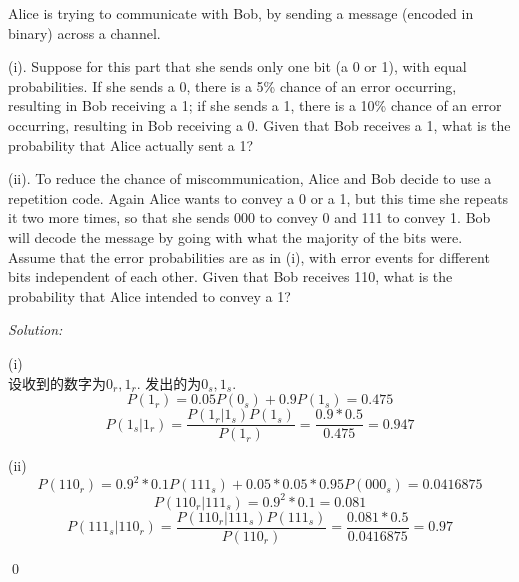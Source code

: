 \documentclass[12pt]{article}
\newenvironment{problem}[2][Problem]{\begin{trivlist}
\item[\hskip \labelsep {\bfseries #1}\hskip \labelsep {\bfseries #2.}]}{\end{trivlist}}
\newenvironment{sol}
    {\emph{Solution:}
    }
    {
    \qed
    }
\newcommand{\f}[2]{\frac{#1}{#2}}                                      %
\begin{document}
\begin{problem}{10}
Alice is trying to communicate with Bob, by sending a message (encoded in binary) across a channel.

(i). Suppose for this part that she sends only one bit (a 0 or 1), with equal probabilities. If she sends a 0, there is a 5\% chance of an error occurring, resulting in Bob receiving a 1; if she sends a 1, there is a 10\% chance of an error occurring, resulting in Bob receiving a 0. Given that Bob receives a 1, what is the probability that Alice actually sent a 1?

(ii). To reduce the chance of miscommunication, Alice and Bob decide to use a repetition code. Again Alice wants to convey a 0 or a 1, but this time she repeats it two more times, so that she sends 000 to convey 0 and 111 to convey 1. Bob will decode the message by going with what the majority of the bits were. Assume that the error probabilities are as in (i), with error events for different bits independent of each other. Given that Bob receives 110, what is the probability that Alice intended to convey a 1?
\end{problem}
\begin{sol}

    (i)\\设收到的数字为$0_r,1_r$. 发出的为$0_s,1_s$.
$$P(1_r) = 0.05P(0_s) +0.9P(1_s) = 0.475$$
$$P(1_s|1_r) = \f{P(1_r|1_s)P(1_s)}{P(1_r)} = \f{0.9*0.5}{0.475} = 0.947$$

    (ii)\\
    $$P(110_r) = 0.9^2*0.1P(111_s) + 0.05*0.05*0.95P(000_s) = 0.0416875$$
    $$P(110_r|111_s)=0.9^2*0.1=0.081$$
    $$P(111_s|110_r) = \f{P(110_r|111_s)P(111_s)}{P(110_r)} = \f{0.081*0.5}{0.0416875}=0.97$$
\end{sol}

\end{document}
